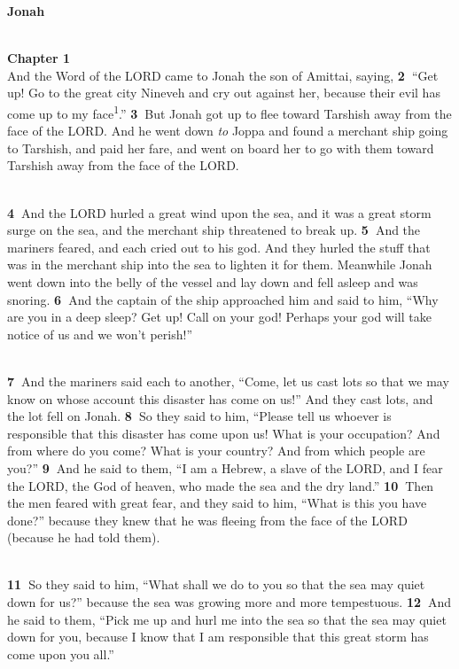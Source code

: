 \documentclass[
]{article}
\author{}
\date{}
\begin{document}
\textbf{Jonah}\\
\strut \\
\textbf{Chapter 1~}\\
And the Word of the LORD came to Jonah the son of Amittai, saying,
\textbf{2~}``Get up! Go to the great city Nineveh and cry out against
her, because their evil has come up to my face\textsuperscript{1}.''
\textbf{3~}But Jonah got up to flee toward Tarshish away from the face
of the LORD. And he went down \emph{to} Joppa and found a merchant ship
going to Tarshish, and paid her fare, and went on board her to go with
them toward Tarshish away from the face of the LORD.\\
\strut \\
\textbf{4~}And the LORD hurled a great wind upon the sea, and it was a
great storm surge on the sea, and the merchant ship threatened to break
up. \textbf{5~}And the mariners feared, and each cried out to his god.
And they hurled the stuff that was in the merchant ship into the sea to
lighten it for them. Meanwhile Jonah went down into the belly of the
vessel and lay down and fell asleep and was snoring. \textbf{6~}And the
captain of the ship approached him and said to him, ``Why are you in a
deep sleep? Get up! Call on your god! Perhaps your god will take notice
of us and we won't perish!''\\
\strut \\
\textbf{7~}And the mariners said each to another, ``Come, let us cast
lots so that we may know on whose account this disaster has come on
us!'' And they cast lots, and the lot fell on Jonah. \textbf{8~}So they
said to him, ``Please tell us whoever is responsible that this disaster
has come upon us! What is your occupation? And from where do you come?
What is your country? And from which people are you?'' \textbf{9~}And he
said to them, ``I am a Hebrew, a slave of the LORD, and I fear the LORD,
the God of heaven, who made the sea and the dry land.'' \textbf{10~}Then
the men feared with great fear, and they said to him, ``What is this you
have done?'' because they knew that he was fleeing from the face of the
LORD (because he had told them).\\
\strut \\
\textbf{11~}So they said to him, ``What shall we do to you so that the
sea may quiet down for us?'' because the sea was growing more and more
tempestuous. \textbf{12~}And he said to them, ``Pick me up and hurl me
into the sea so that the sea may quiet down for you, because I know that
I am responsible that this great storm has come upon you all.''
\end{document}
